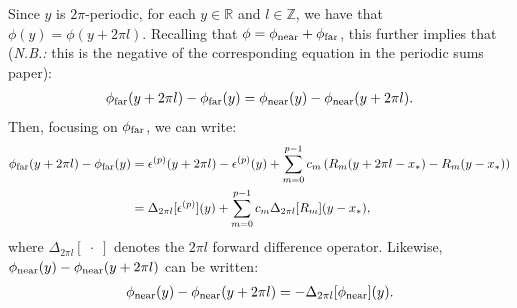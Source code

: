 Since $y$ is $2\pi$-periodic, for each $y \in \mathbb{R}$ and
$l \in \mathbb{Z}$, we have that $\phi(y) = \phi(y + 2\pi l)$.
Recalling that $\phi = \phi_{\operatorname{near}} + \phi_{\operatorname{far}}$, this further implies that
(\emph{N.B.:} this is the negative of the corresponding equation in
the periodic sums paper):
\begin{align*}
  \phi_{\operatorname{far}}(y + 2\pi l) - \phi_{\operatorname{far}}(y) = \phi_{\operatorname{near}}(y) - \phi_{\operatorname{near}}(y + 2\pi l).
\end{align*}
Then, focusing on $\phi_{\operatorname{far}}$, we can write:
\begin{align*}
  \phi_{\operatorname{far}}(y + 2\pi l) - \phi_{\operatorname{far}}(y) &= \epsilon^{(p)}(y + 2\pi l) - \epsilon^{(p)}(y) + \sum_{m=0}^{p-1} c_m \left(R_m(y + 2\pi l - x_*) - R_m(y - x_*)\right) \\
  &= \Delta_{2\pi l}[\epsilon^{(p)}](y) + \sum_{m=0}^{p-1} c_m \Delta_{2\pi l}[R_m](y - x_*),
\end{align*}
where $\Delta_{2\pi l}[\;\cdot\;]$
denotes the $2\pi l$
forward difference operator. Likewise,
$\phi_{\operatorname{near}}(y) - \phi_{\operatorname{near}}(y + 2\pi l)$ can be written:
\begin{align*}
  \phi_{\operatorname{near}}(y) - \phi_{\operatorname{near}}(y + 2\pi l) = - \Delta_{2\pi l}[\phi_{\operatorname{near}}](y).
\end{align*}

